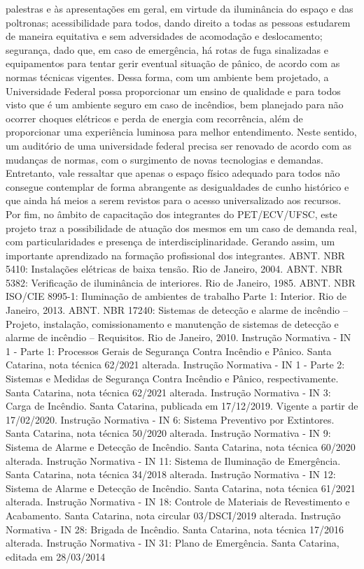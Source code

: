 palestras e às apresentações em geral, em virtude da iluminância do espaço e das poltronas;
acessibilidade para todos, dando direito a todas as pessoas estudarem de maneira equitativa e
sem adversidades de acomodação e deslocamento; segurança, dado que, em caso de emergência,
há rotas de fuga sinalizadas e equipamentos para tentar gerir eventual situação de pânico, de
acordo com as normas técnicas vigentes.
Dessa forma, com um ambiente bem projetado, a Universidade Federal possa
proporcionar um ensino de qualidade e para todos visto que é um ambiente seguro em caso de
incêndios, bem planejado para não ocorrer choques elétricos e perda de energia com recorrência,
além de proporcionar uma experiência luminosa para melhor entendimento. Neste sentido, um
auditório de uma universidade federal precisa ser renovado de acordo com as mudanças de
normas, com o surgimento de novas tecnologias e demandas. Entretanto, vale ressaltar que
apenas o espaço físico adequado para todos não consegue contemplar de forma abrangente as
desigualdades de cunho histórico e que ainda há meios a serem revistos para o acesso
universalizado aos recursos. Por fim, no âmbito de capacitação dos integrantes do
PET/ECV/UFSC, este projeto traz a possibilidade de atuação dos mesmos em um caso de
demanda real, com particularidades e presença de interdisciplinaridade. Gerando assim, um
importante aprendizado na formação profissional dos integrantes.
ABNT. NBR 5410: Instalações elétricas de baixa tensão. Rio de Janeiro, 2004.
ABNT. NBR 5382: Verificação de iluminância de interiores. Rio de Janeiro, 1985.
ABNT. NBR ISO/CIE 8995-1: Iluminação de ambientes de trabalho Parte 1: Interior. Rio de
Janeiro, 2013.
ABNT. NBR 17240: Sistemas de detecção e alarme de incêndio – Projeto, instalação,
comissionamento e manutenção de sistemas de detecção e alarme de incêndio – Requisitos.
Rio de Janeiro, 2010.
Instrução Normativa - IN 1 - Parte 1: Processos Gerais de Segurança Contra Incêndio e
Pânico. Santa Catarina, nota técnica 62/2021 alterada.
Instrução Normativa - IN 1 - Parte 2: Sistemas e Medidas de Segurança Contra Incêndio e
Pânico, respectivamente. Santa Catarina, nota técnica 62/2021 alterada.
Instrução Normativa - IN 3: Carga de Incêndio. Santa Catarina, publicada em 17/12/2019.
Vigente a partir de 17/02/2020.
Instrução Normativa - IN 6: Sistema Preventivo por Extintores. Santa Catarina, nota técnica
50/2020 alterada.
Instrução Normativa - IN 9: Sistema de Alarme e Detecção de Incêndio. Santa Catarina, nota
técnica 60/2020 alterada.
Instrução Normativa - IN 11: Sistema de Iluminação de Emergência. Santa Catarina, nota
técnica 34/2018 alterada.
Instrução Normativa - IN 12: Sistema de Alarme e Detecção de Incêndio. Santa Catarina, nota
técnica 61/2021 alterada.
Instrução Normativa - IN 18: Controle de Materiais de Revestimento e Acabamento. Santa
Catarina, nota circular 03/DSCI/2019 alterada.
Instrução Normativa - IN 28: Brigada de Incêndio. Santa Catarina, nota técnica 17/2016
alterada.
Instrução Normativa - IN 31: Plano de Emergência. Santa Catarina, editada em 28/03/2014

